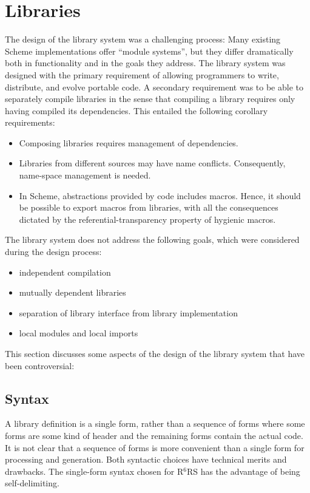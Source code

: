 \documentclass[twoside,twocolumn]{algol60}
\newcommand{\rn}[1]{R$^{#1}$RS}
\begin{document}
\chapter{Libraries}

The design of the library system was a challenging process: Many
existing Scheme implementations offer ``module systems'', but they
differ dramatically both in functionality and in the goals they
address.  The library system was designed with the primary
requirement of allowing programmers to write, distribute, and evolve
portable code.  A secondary requirement was to be able to separately
compile libraries in the sense that compiling a library requires only
having compiled its dependencies.  This entailed the following
corollary requirements:
%
\begin{itemize}
\item Composing libraries requires management of dependencies.
\item Libraries from different sources may have name conflicts.
  Consequently, name-space management is needed.
\item In Scheme, abstractions provided by code includes macros.
  Hence, it should be possible to export macros from libraries, with all
  the consequences dictated by the referential-transparency property
  of hygienic macros.
\end{itemize}
%
The library system does not address the following goals, which were
considered during the design process:
%
\begin{itemize}
\item independent compilation
\item mutually dependent libraries
\item separation of library interface from library implementation
\item local modules and local imports
\end{itemize}
%
This section discusses some aspects of the design of the library
system that have been controversial:

\section{Syntax}

A library definition is a single form, rather than a sequence of forms
where some forms are some kind of header and the remaining forms
contain the actual code.
It is not clear that a sequence of forms is more convenient than a
single form for processing and generation. Both syntactic choices have
technical merits and drawbacks. The single-form syntax chosen for
\rn{6} has the advantage of being self-delimiting.
\end{document}
